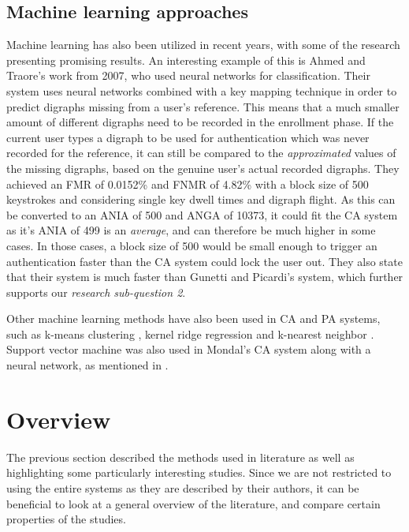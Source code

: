 \documentclass[informationsecurity]{gucmasterproject}
\begin{document}
\subsection{Machine learning approaches}
Machine learning has also been utilized in recent years, with some of the research presenting promising results.
An interesting example of this is Ahmed and Traore's \cite{Ahmed} work from 2007, who used neural networks for classification.
Their system uses neural networks combined with a key mapping technique in order to predict digraphs missing from a user's reference.
This means that a much smaller amount of different digraphs need to be recorded in the enrollment phase.
If the current user types a digraph to be used for authentication which was never recorded for the reference, it can still be compared to the \textit{approximated} values of the missing digraphs, based on the genuine user's actual recorded digraphs.
They achieved an FMR of 0.0152\% and FNMR of 4.82\% with a block size of 500 keystrokes and considering single key dwell times and digraph flight.
As this can be converted to an ANIA of 500 and ANGA of 10373, it could fit the CA system as it's ANIA of 499 is an \textit{average}, and can therefore be much higher in some cases.
In those cases, a block size of 500 would be small enough to trigger an authentication faster than the CA system could lock the user out.
They also state that their system is much faster than Gunetti and Picardi's system, which further supports our \textit{research sub-question 2}.

Other machine learning methods have also been used in CA and PA systems, such as k-means clustering \cite{KIM2017, Solami}, kernel ridge regression \cite{900words} and k-nearest neighbor \cite{hu, monaco}.
Support vector machine was also used in Mondal's \cite{mondal} CA system along with a neural network, as mentioned in .



\section{Overview}
\label{sec:related-overview}
The previous section described the methods used in literature as well as highlighting some particularly interesting studies.
Since we are not restricted to using the entire systems as they are described by their authors, it can be beneficial to look at a general overview of the literature, and compare certain properties of the studies.
\end{document}
